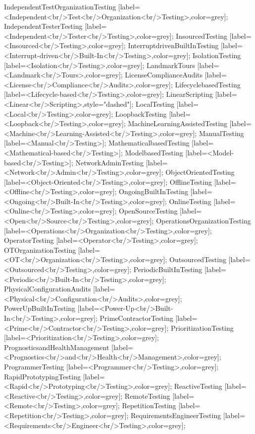 \documentclass{article}
\begin{document}
{IndependentTestOrganizationTesting [label=<Independent<br/>Test<br/>Organization<br/>Testing>,color=grey];
IndependentTesterTesting [label=<Independent<br/>Tester<br/>Testing>,color=grey];
InsourcedTesting [label=<Insourced<br/>Testing>,color=grey];
InterruptdrivenBuiltInTesting [label=<Interrupt-driven<br/>Built-In<br/>Testing>,color=grey];
IsolationTesting [label=<Isolation<br/>Testing>,color=grey];
LandmarkTours [label=<Landmark<br/>Tours>,color=grey];
LicenseComplianceAudits [label=<License<br/>Compliance<br/>Audits>,color=grey];
LifecyclebasedTesting [label=<Lifecycle-based<br/>Testing>,color=grey];
LinearScripting [label=<Linear<br/>Scripting>,style="dashed"];
LocalTesting [label=<Local<br/>Testing>,color=grey];
LoopbackTesting [label=<Loopback<br/>Testing>,color=grey];
MachineLearningAssistedTesting [label=<Machine<br/>Learning-Assisted<br/>Testing>,color=grey];
ManualTesting [label=<Manual<br/>Testing>];
MathematicalbasedTesting [label=<Mathematical-based<br/>Testing>];
ModelbasedTesting [label=<Model-based<br/>Testing>];
NetworkAdminTesting [label=<Network<br/>Admin<br/>Testing>,color=grey];
ObjectOrientedTesting [label=<Object-Oriented<br/>Testing>,color=grey];
OfflineTesting [label=<Offline<br/>Testing>,color=grey];
OngoingBuiltInTesting [label=<Ongoing<br/>Built-In<br/>Testing>,color=grey];
OnlineTesting [label=<Online<br/>Testing>,color=grey];
OpenSourceTesting [label=<Open<br/>Source<br/>Testing>,color=grey];
OperationsOrganizationTesting [label=<Operations<br/>Organization<br/>Testing>,color=grey];
OperatorTesting [label=<Operator<br/>Testing>,color=grey];
OTOrganizationTesting [label=<OT<br/>Organization<br/>Testing>,color=grey];
OutsourcedTesting [label=<Outsourced<br/>Testing>,color=grey];
PeriodicBuiltInTesting [label=<Periodic<br/>Built-In<br/>Testing>,color=grey];
PhysicalConfigurationAudits [label=<Physical<br/>Configuration<br/>Audits>,color=grey];
PowerUpBuiltInTesting [label=<Power-Up<br/>Built-In<br/>Testing>,color=grey];
PrimeContractorTesting [label=<Prime<br/>Contractor<br/>Testing>,color=grey];
PrioritizationTesting [label=<Prioritization<br/>Testing>,color=grey];
PrognosticsandHealthManagement [label=<Prognostics<br/>and<br/>Health<br/>Management>,color=grey];
ProgrammerTesting [label=<Programmer<br/>Testing>,color=grey];
RapidPrototypingTesting [label=<Rapid<br/>Prototyping<br/>Testing>,color=grey];
ReactiveTesting [label=<Reactive<br/>Testing>,color=grey];
RemoteTesting [label=<Remote<br/>Testing>,color=grey];
RepetitionTesting [label=<Repetition<br/>Testing>,color=grey];
RequirementsEngineerTesting [label=<Requirements<br/>Engineer<br/>Testing>,color=grey];
}
\end{document}
